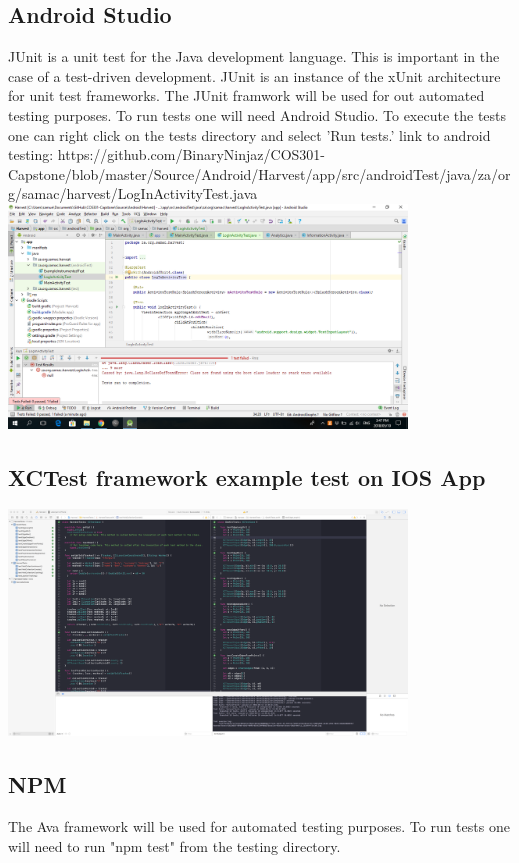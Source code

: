 \documentclass[12pt]{article}
\begin{document}
  \subsection{Android Studio}
JUnit is a unit test for the Java development language. This is important in the case of a test-driven development. JUnit is an instance of the xUnit architecture for unit test frameworks. The JUnit framwork will be used for out automated testing purposes. To run tests one will need Android Studio. To execute the tests one can right click on the tests directory and select 'Run tests.'\newline
link to android testing: https://github.com/BinaryNinjaz/COS301-Capstone/blob/master/Source/Android/Harvest/app/src/androidTest/java/za/org/samac/harvest/LogInActivityTest.java \newline
\includegraphics[width=400px]{images/FailedLoginTest}
\subsection{ XCTest framework example test on IOS App}
\includegraphics[width=400px]{images/iostest}

  \subsection{NPM}
  The Ava framework will be used for automated testing purposes. To run tests one will need to run "npm test" from the testing directory.
\end{document}
